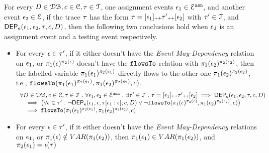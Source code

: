 \begin{lem}
		\label{lem:inv_indepevents}
		For every $D \in \mathcal{DB} , c \in \mathcal{C}, \mathtt{\tau} \in \mathcal{T}$, one assignment events 
		$\mathtt{\epsilon}_1\in \mathcal{E}^{\mathtt{{asn}}}$, and another event $\mathtt{\epsilon}_2 \in \mathcal{E}$,
		if the trace $\mathtt{\tau}$ has the form $\mathtt{\tau} = [\mathtt{\epsilon}_1] {\scriptscriptstyle ++} \mathtt{\tau}' {\scriptscriptstyle ++} [\mathtt{\epsilon}_2]$ with $\mathtt{\tau}' \in \mathcal{T}$, 
		and $\mathsf{DEP_{\mathtt{e}}}(\mathtt{\epsilon}_1, \mathtt{\epsilon}_2, \mathtt{\tau}, c, D)$,
		then the following two conclusions hold when $\mathtt{\epsilon}_2$ is an assignment event and a testing event respectively.
	\begin{itemize}
		\item
		For every $\mathtt{\epsilon} \in \mathtt{\tau}'$, if it either doesn't have the \emph{Event May-Dependency} relation on $\mathtt{\epsilon}_1$, 
		or $\pi_1(\mathtt{\epsilon})^{\pi_2(\mathtt{\epsilon})}$ doesn't have the $\mathtt{flowsTo}$ relation with $ \pi_1(\mathtt{\epsilon}_2)^{\pi_2(\mathtt{\epsilon}_2)}$,
		then the labelled variable $\pi_1(\mathtt{\epsilon}_1)^{\pi_2(\mathtt{\epsilon}_1)}$ directly flows to the other one $\pi_1(\mathtt{\epsilon}_2)^{\pi_2(\mathtt{\epsilon}_2)}$, 
		i.e., $\mathtt{flowsTo}(\pi_1(\mathtt{\epsilon}_1)^{\pi_2(\mathtt{\epsilon}_1)}, \pi_1(\mathtt{\epsilon}_2)^{\pi_2(\mathtt{\epsilon}_2)}, c)$.
		\[
		\begin{array}{l}
			\forall D \in \dbdom , c \in \cdom, \trace \in \mathcal{T} \st \forall \event_1, \event_2 \in \eventset^{\asn} \st
			 \exists \trace' \in \mathcal{T} \st \trace = [\event_1] \tracecat \trace' \tracecat [\event_2]
			\implies
			\eventdep(\event_1, \event_2, \trace, c, D) 
			\\ \quad 
			\implies 
			\left( \forall \event \in \trace' \st \neg \eventdep(\event_1, \event, \trace[\event_1:\event], c, D)
			\lor \neg \flowsto(\pi_1(\event)^{\pi_2(\event)}, \pi_1(\event_2)^{\pi_2(\event_2)}, c) 
			\right) 
			\\ \quad 
			\implies 
			\flowsto(\pi_1(\event_1)^{\pi_2(\event_1)}, \pi_1(\event_2)^{\pi_2(\event_2)}, c)
		\end{array}
		\]
\item 
For every $\mathtt{\epsilon} \in \mathtt{\tau}'$, if it either doesn't have the \emph{Event May-Dependency} relations on $\mathtt{\epsilon}_1$,
or $\pi_1(\mathtt{\epsilon}) \notin VAR(\pi_1(\mathtt{\epsilon}_2)) $,
then 
$\pi_1(\mathtt{\epsilon}_1) \in VAR(\pi_1(\mathtt{\epsilon}_2))$, and $ {\pi_2(\mathtt{\epsilon}_1)} = \iota(\mathtt{\tau})$

\end{itemize}
\end{lem}
